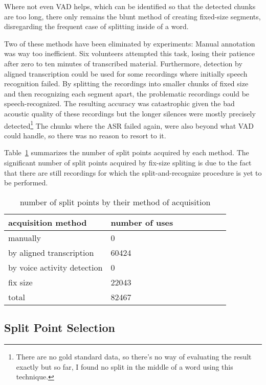 \documentclass{llncs}
\begin{document}
Where not even VAD helps, which can be identified so that the detected chunks
are too long, there only remains the blunt method of creating fixed-size
segments, disregarding the frequent case of splitting inside of a word.

Two of these methods have been eliminated by experiments: Manual annotation was
way too inefficient. Six volunteers attempted this task, losing their patience
after zero to ten minutes of transcribed material. Furthermore, detection by aligned
transcription could be used for some recordings where initially speech
recognition failed. By splitting the recordings into smaller chunks of fixed
size and then
recognizing each segment apart, the problematic recordings could be
speech-recognized. The resulting accuracy was catastrophic given the bad
acoustic quality of these recordings but the
longer silences were mostly precisely detected\footnote{There are no gold
standard data, so there's no way of evaluating the result exactly but so far, I
found no split in the middle of a word using this technique.} The chunks where
the ASR failed again, were also beyond what VAD could handle, so there was no reason
to resort to it.

Table~\ref{tab:splitpoints} summarizes the number of split points acquired by
each method. The significant number of split points acquired by fix-size
spliting is due to the fact that there are still recordings for which the
split-and-recognize procedure is yet to be performed.

\begin{table}[htpb]
\begin{center}
\begin{tabular}{|l|l|l|l||l|l|l|l|}
\hline
acquisition method & number of uses \\
\hline
manually & 0 \\
by aligned transcription & 60424 \\
by voice activity detection & 0 \\
fix size & 22043 \\
total & 82467 \\
\hline
\end{tabular}
\caption{number of split points by their method of
acquisition}\label{tab:splitpoints}
\end{center}
\end{table}

\subsection{Split Point Selection}
\end{document}
